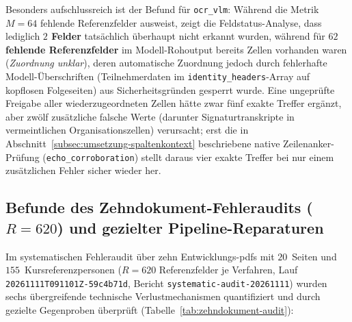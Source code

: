 Besonders aufschlussreich ist der Befund für \texttt{ocr\_vlm}: Während die Metrik $M = 64$ fehlende Referenzfelder ausweist, zeigt die Feldstatus-Analyse, dass lediglich \textbf{$2$ Felder} tatsächlich überhaupt nicht erkannt wurden, während für \textbf{$62$ fehlende Referenzfelder} im Modell-Rohoutput bereits Zellen vorhanden waren (\emph{Zuordnung unklar}), deren automatische Zuordnung jedoch durch fehlerhafte Modell-Überschriften (Teilnehmerdaten im \texttt{identity\_headers}-Array auf kopflosen Folgeseiten) aus Sicherheitsgründen gesperrt wurde. Eine ungeprüfte Freigabe aller wiederzugeordneten Zellen hätte zwar fünf exakte Treffer ergänzt, aber zwölf zusätzliche falsche Werte (darunter Signaturtranskripte in vermeintlichen Organisationszellen) verursacht; erst die in Abschnitt~\ref{subsec:umsetzung-spaltenkontext} beschriebene native Zeilenanker-Prüfung (\texttt{echo\_corroboration}) stellt daraus vier exakte Treffer bei nur einem zusätzlichen Fehler sicher wieder her.

\subsection{Befunde des Zehndokument-Fehleraudits (\texorpdfstring{$R = 620$}{R = 620}) und gezielter Pipeline-Reparaturen}
\label{subsec:ergebnisse-zehndokument}

Im systematischen Fehleraudit über zehn Entwicklungs-\acp{pdf} mit $20$~Seiten und $155$~Kursreferenzpersonen ($R = 620$ Referenzfelder je Verfahren, Lauf \texttt{20261111T091101Z-59c4b71d}, Bericht \texttt{systematic-audit-20261111}) wurden sechs übergreifende technische Verlustmechanismen quantifiziert und durch gezielte Gegenproben überprüft (Tabelle~\ref{tab:zehndokument-audit}):


